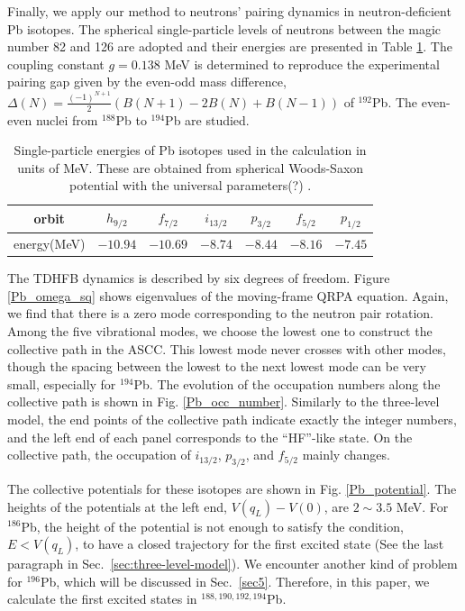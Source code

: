 \documentclass[%
superscriptaddress,
showpacs,
nofootinbib,
amsmath,amssymb,
aps,
prc,
twocolumn,
floatfix ]%
{revtex4-1}
\begin{document}
Finally, we apply our method to neutrons' pairing dynamics in 
neutron-deficient Pb isotopes.
The spherical single-particle levels of neutrons
between the magic number 82 and 126 are adopted and
their energies are presented in Table \ref{Pb}. 
The coupling constant $g=0.138$ MeV is determined to reproduce
the experimental pairing gap given by the even-odd mass difference,
$\Delta(N)=\frac{(-1)^{N+1}}{2}(B(N+1)-2B(N)+B(N-1))$ of ${}^{192}$Pb.
The even-even nuclei from ${}^{188}$Pb to ${}^{194}$Pb
are studied.
\begin{table}[htbp]
\begin{ruledtabular}
\begin{tabular}{c|cccccc}
  orbit& $h_{9/2}$ & $f_{7/2}$ & $i_{13/2}$ & $p_{3/2}$ & $f_{5/2}$ & $p_{1/2}$\\ \hline
  energy(MeV)& $-10.94$ & $-10.69$ & $-8.74$ & $-8.44$ & $-8.16$ & $-7.45$\\
\end{tabular}
\end{ruledtabular}
\caption{Single-particle energies of Pb isotopes used in the calculation
in units of MeV.
These are obtained from spherical Woods-Saxon potential
with the universal parameters(?) \cite{??}. }
\label{Pb}
\end{table}

The TDHFB dynamics is described by six degrees of freedom.
Figure \ref{Pb_omega_sq} shows eigenvalues of the
moving-frame QRPA equation.
Again, we find that there is a zero mode corresponding to
the neutron pair rotation.
Among the five vibrational modes, we choose the lowest one to
construct the collective path in the ASCC.
This lowest mode never crosses with other modes,
though the spacing between the lowest to the next lowest mode
can be very small, especially for ${}^{194}$Pb.
The evolution of the occupation numbers along the collective path
is shown in Fig. \ref{Pb_occ_number}.
Similarly to the three-level model, 
the end points of the collective path indicate exactly
the integer numbers, and
the left end of each panel corresponds to the ``HF''-like state.
On the collective path, the occupation of $i_{13/2}$, $p_{3/2}$, and
$f_{5/2}$ mainly changes.

The collective potentials for these isotopes are shown
in Fig. \ref{Pb_potential}.
The heights of the potentials at the left end, $V(q_L)-V(0)$,
are $2\sim3.5$ MeV.
For $^{186}$Pb, the height of the potential is not
enough to satisfy the condition, $E<V(q_L)$,
to have a closed trajectory for the first excited state
(See the last paragraph in Sec.~\ref{sec:three-level-model}).
We encounter another kind of problem for $^{196}$Pb,
which will be discussed in Sec.~\ref{sec5}.
Therefore, in this paper, we calculate the first excited states
in $^{188,190,192,194}$Pb.
\end{document}
